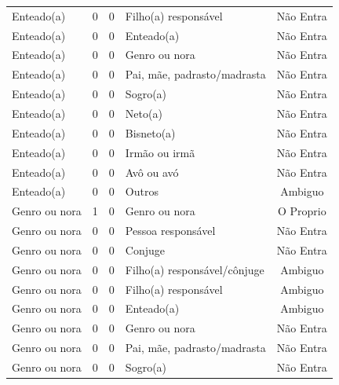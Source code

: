 \documentclass[
	12pt,				%
	openright,			%
	twoside,			%
	a4paper,			%
	english,			%
	french,				%
	spanish,			%
	brazil				%
	]{abntex2}
\begin{document}
\begin{anexosenv}
\begin{longtable}{@{}lcclc@{}}
Enteado(a)                   & 0         & 0        & Filho(a) responsável         & Não Entra       \\
Enteado(a)                   & 0         & 0        & Enteado(a)                   & Não Entra       \\
Enteado(a)                   & 0         & 0        & Genro ou nora                & Não Entra       \\
Enteado(a)                   & 0         & 0        & Pai, mãe, padrasto/madrasta  & Não Entra       \\
Enteado(a)                   & 0         & 0        & Sogro(a)                     & Não Entra       \\
Enteado(a)                   & 0         & 0        & Neto(a)                      & Não Entra       \\
Enteado(a)                   & 0         & 0        & Bisneto(a)                   & Não Entra       \\
Enteado(a)                   & 0         & 0        & Irmão ou irmã                & Não Entra       \\
Enteado(a)                   & 0         & 0        & Avô ou avó                   & Não Entra       \\
Enteado(a)                   & 0         & 0        & Outros                       & Ambiguo         \\
Genro ou nora                & 1         & 0        & Genro ou nora                & O Proprio       \\
Genro ou nora                & 0         & 0        & Pessoa responsável           & Não Entra       \\
Genro ou nora                & 0         & 0        & Conjuge                      & Não Entra       \\
Genro ou nora                & 0         & 0        & Filho(a) responsável/cônjuge & Ambiguo         \\
Genro ou nora                & 0         & 0        & Filho(a) responsável         & Ambiguo         \\
Genro ou nora                & 0         & 0        & Enteado(a)                   & Ambiguo         \\
Genro ou nora                & 0         & 0        & Genro ou nora                & Não Entra       \\
Genro ou nora                & 0         & 0        & Pai, mãe, padrasto/madrasta  & Não Entra       \\
Genro ou nora                & 0         & 0        & Sogro(a)                     & Não Entra       \\

\end{longtable}
\end{anexosenv}
\end{document}

